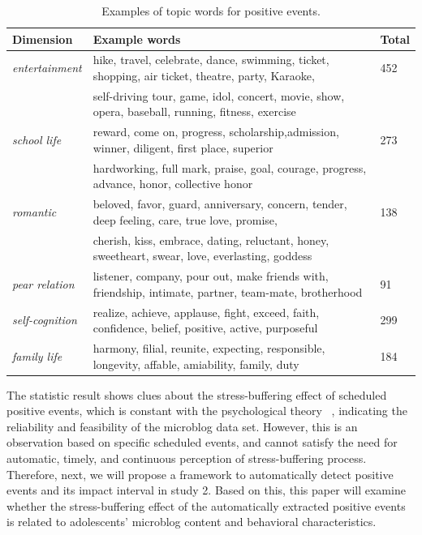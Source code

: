 \begin{table}
\centering
\caption{\small{Examples of topic words for positive events.}}
\label{tab:keyWords}
\small{
\begin{tabular}{lll}
\toprule
Dimension & Example words & Total \\ \midrule
\emph{entertainment}  & hike, travel, celebrate, dance, swimming, ticket, shopping, air ticket, theatre, party, Karaoke,& 452\\
                      & self-driving tour, game, idol, concert, movie, show, opera, baseball, running, fitness, exercise & \\
\emph{school life}    & reward, come on, progress, scholarship,admission, winner, diligent, first place, superior & 273\\
				      & hardworking, full mark,  praise, goal, courage, progress, advance, honor, collective honor& \\
\emph{romantic}       &  beloved, favor, guard, anniversary,  concern, tender, deep feeling, care, true love, promise, & 138\\
				      & cherish, kiss, embrace, dating, reluctant, honey, sweetheart, swear, love, everlasting, goddess &\\
\emph{pear relation}  & listener, company, pour out, make friends with, friendship, intimate, partner, team-mate, brotherhood& 91\\
\emph{self-cognition} & realize, achieve, applause, fight, exceed, faith, confidence, belief, positive, active, purposeful & 299\\
\emph{family life}    & harmony, filial, reunite, expecting, responsible, longevity, affable, amiability, family, duty & 184\\
\bottomrule
\end{tabular}}
\end{table}


The statistic result shows clues about the stress-buffering effect of scheduled positive events, 
which is constant with the psychological theory ~\citep{Cohen1984Positive, Cohen2010Positive, Needles1990Positive},
indicating the reliability and feasibility of the microblog data set.
However, 
this is an observation based on specific scheduled events,
and cannot satisfy the need for automatic, timely, and continuous perception of stress-buffering process. 
Therefore, next, we will propose a framework to automatically detect positive events and its impact interval in study 2. 
Based on this, this paper will examine whether the stress-buffering effect of the automatically extracted positive events 
is related to adolescents' microblog content and behavioral characteristics.